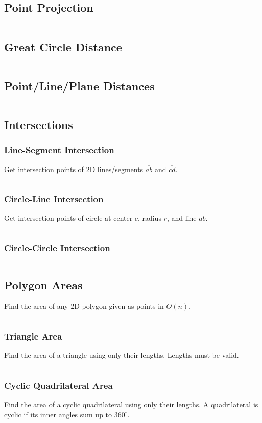 \documentclass[8pt,a4paper,landscape,oneside]{amsart}
\newcommand{\code}[1]{\inputminted[fontsize=\normalsize,baselinestretch=1]{cpp}{_code/#1}}
\begin{document}
\begin{multicols*}{3}
	\subsection{Point Projection}
    \code{geom/pt-proj.cpp}
	\subsection{Great Circle Distance}
    \code{geom/great-circle.cpp}
	\subsection{Point/Line/Plane Distances}
    \code{geom/dists.cpp}
	\subsection{Intersections}
    \subsubsection{Line-Segment Intersection}
      Get intersection points of 2D lines/segments $\overline{ab}$ and $\overline{cd}$.
      \code{geom/line-seg-isect.cpp}
    \subsubsection{Circle-Line Intersection}
      Get intersection points of circle at center $c$, radius $r$, and line $\overline{ab}$.
      \code{geom/circ-line-isect.cpp}
    \subsubsection{Circle-Circle Intersection}
      \code{geom/circ-circ-isect.cpp}
	\subsection{Polygon Areas}
    Find the area of any 2D polygon given as points in $O(n)$.
    \code{geom/poly-area.cpp}
    \subsubsection{Triangle Area}
      Find the area of a triangle using only their lengths. Lengths must be valid.
      \code{geom/tri-area.cpp}
    \subsubsection*{Cyclic Quadrilateral Area}
      Find the area of a cyclic quadrilateral using only their lengths. A quadrilateral is
      cyclic if its inner angles sum up to $360^\circ$.
      \code{geom/cyc-quad-area.cpp}

\end{multicols*}
\end{document}
